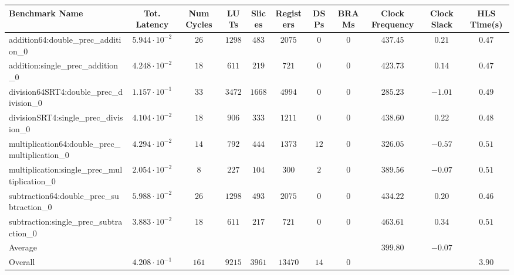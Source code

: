 \begin{tabular}{|l|c|c|c|c|c|c|c|c|c|c|}
\hline
Benchmark Name                                   & Tot. Latency            & Num Cycles & LUTs     & Slices   & Registers & DSPs   & BRAMs & Clock Frequency & Clock Slack & HLS Time(s) \\
\hline
addition64:double\_prec\_addition\_0             & $ 5.944 \cdot 10^{-2} $ & $ 26     $ & $ 1298 $ & $ 483  $ & $ 2075  $ & $ 0  $ & $ 0 $ & $ 437.45      $ & $ 0.21    $ & $ 0.47    $ \\
addition:single\_prec\_addition\_0               & $ 4.248 \cdot 10^{-2} $ & $ 18     $ & $ 611  $ & $ 219  $ & $ 721   $ & $ 0  $ & $ 0 $ & $ 423.73      $ & $ 0.14    $ & $ 0.47    $ \\
division64SRT4:double\_prec\_division\_0         & $ 1.157 \cdot 10^{-1} $ & $ 33     $ & $ 3472 $ & $ 1668 $ & $ 4994  $ & $ 0  $ & $ 0 $ & $ 285.23      $ & $ -1.01   $ & $ 0.49    $ \\
divisionSRT4:single\_prec\_division\_0           & $ 4.104 \cdot 10^{-2} $ & $ 18     $ & $ 906  $ & $ 333  $ & $ 1211  $ & $ 0  $ & $ 0 $ & $ 438.60      $ & $ 0.22    $ & $ 0.48    $ \\
multiplication64:double\_prec\_multiplication\_0 & $ 4.294 \cdot 10^{-2} $ & $ 14     $ & $ 792  $ & $ 444  $ & $ 1373  $ & $ 12 $ & $ 0 $ & $ 326.05      $ & $ -0.57   $ & $ 0.51    $ \\
multiplication:single\_prec\_multiplication\_0   & $ 2.054 \cdot 10^{-2} $ & $ 8      $ & $ 227  $ & $ 104  $ & $ 300   $ & $ 2  $ & $ 0 $ & $ 389.56      $ & $ -0.07   $ & $ 0.51    $ \\
subtraction64:double\_prec\_subtraction\_0       & $ 5.988 \cdot 10^{-2} $ & $ 26     $ & $ 1298 $ & $ 493  $ & $ 2075  $ & $ 0  $ & $ 0 $ & $ 434.22      $ & $ 0.20    $ & $ 0.46    $ \\
subtraction:single\_prec\_subtraction\_0         & $ 3.883 \cdot 10^{-2} $ & $ 18     $ & $ 611  $ & $ 217  $ & $ 721   $ & $ 0  $ & $ 0 $ & $ 463.61      $ & $ 0.34    $ & $ 0.51    $ \\
\hline
Average                                          & $                     $ & $        $ & $      $ & $      $ & $       $ & $    $ & $   $ & $ 399.80      $ & $ -0.07   $ & $         $ \\
\hline
Overall                                          & $ 4.208 \cdot 10^{-1} $ & $ 161    $ & $ 9215 $ & $ 3961 $ & $ 13470 $ & $ 14 $ & $ 0 $ & $             $ & $         $ & $ 3.90    $ \\
\hline
\end{tabular}
